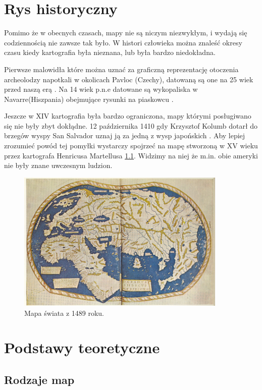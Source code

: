 
\chapter{Rys historyczny}
\label{sec:hisotryMap}

Pomimo że w obecnych czasach, mapy nie są niczym niezwykłym, i wydają się codziennością nie zawsze tak było. W histori człowieka można znaleść okresy czasu kiedy kartografia była nieznana, lub była bardzo niedokładna.

Pierwsze malowidła które można uznać za graficzną reprezentację otoczenia archeolodzy napotkali w okolicach Pavloc (Czechy), datowaną są one na 25 wiek przed naszą erą \cite{pre2} . Na 14 wiek p.n.e datowane są wykopaliska w Navarre(Hiszpania) obejmujące rysunki na piaskowcu \cite{pre1}.

Jeszcze w XIV kartografia była bardzo ograniczona, mapy którymi posługiwano się nie były zbyt dokłądne. 12 października 1410 gdy Krzysztof Kolumb dotarł do brzegów wyspy San Salvador uznaj ją za jedną z wysp japońskich \cite{columb}. Aby lepiej zrozumieć powód tej pomyłki wystarczy spojrzeć na mapę stworzoną w XV wieku przez kartografa Henricusa Martellusa \ref{fig:worldMap1}. Widzimy na niej że m.in. obie ameryki nie były znane uwczesnym ludzion.

\begin{figure}[H]
  \centering
    \includegraphics[width=100mm]{ge/worldMap1.jpg}
  \caption{Mapa świata z 1489 roku.}
  \label{fig:worldMap1}
\end{figure}

\chapter{Podstawy teoretyczne}
\label{cha:podstawyTeoretyczne}

\section{Rodzaje map}
\label{sec:Rodzaje map}

